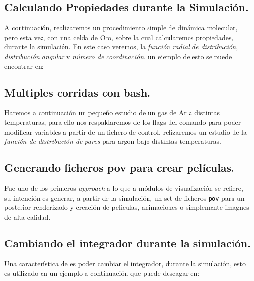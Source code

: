 
\subsection{Calculando Propiedades durante la Simulaci\'on.}

A continuaci\'on, realizaremos un procedimiento simple de din\'amica molecular, pero esta vez, con una celda de Oro, sobre la cual calcularemos propiedades, durante la simulaci\'on. En este caso veremos, la \textit{funci\'on radial de distribuci\'on}, \textit{distribuci\'on angular} y \textit{n\'umero de coordinaci\'on}, un ejemplo de esto se puede encontrar en:


\subsection{Multiples corridas con bash.}

Haremos a continuaci\'on un peque\~no estudio de un gas de Ar a distintas temperaturas, para ello nos respaldaremos de los flags del comando \lpmd para poder modificar variables a partir de un fichero de control, relizaremos un estudio de la \textit{funci\'on de distribuci\'on de pares} para argon bajo distintas temperaturas.

\subsection{Generando ficheros pov para crear pel\'iculas.}

Fue uno de los primeros \textit{approach} a lo que a m\'odulos de visualizaci\'on se refiere, su intenci\'on es generar, a partir de la simulaci\'on, un set de ficheros \verb|pov| para un posterior renderizado y creaci\'on de peliculas, animaciones o simplemente imagnes de alta calidad.

\subsection{Cambiando el integrador durante la simulaci\'on.}

Una caracter\'istica de \lpmd es poder cambiar el integrador, durante la simulaci\'on, esto es utilizado en un ejemplo a continuaci\'on que puede descagar en:


